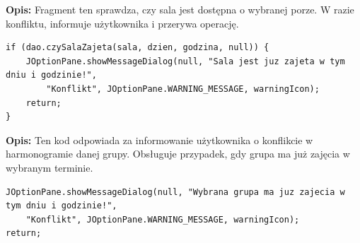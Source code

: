 \textbf{Opis:} Fragment ten sprawdza, czy sala jest dostępna o wybranej porze. W razie konfliktu, informuje użytkownika i przerywa operację.

\begin{lstlisting}[caption={Sprawdzanie dostępności sali}, label={lst:sala}]
if (dao.czySalaZajeta(sala, dzien, godzina, null)) {
    JOptionPane.showMessageDialog(null, "Sala jest juz zajeta w tym dniu i godzinie!",
        "Konflikt", JOptionPane.WARNING_MESSAGE, warningIcon);
    return;
}
\end{lstlisting}

\textbf{Opis:} Ten kod odpowiada za informowanie użytkownika o konflikcie w harmonogramie danej grupy. Obsługuje przypadek, gdy grupa ma już zajęcia w wybranym terminie.

\begin{lstlisting}[caption={Sprawdzenie konfliktu grupy}, label={lst:grupa}]
JOptionPane.showMessageDialog(null, "Wybrana grupa ma juz zajecia w tym dniu i godzinie!",
    "Konflikt", JOptionPane.WARNING_MESSAGE, warningIcon);
return;
\end{lstlisting}
